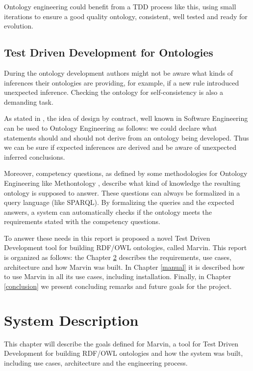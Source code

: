 \documentclass{report}
\begin{document}
Ontology engineering could benefit from a TDD process like this, using small iterations
to ensure a good quality ontology, consistent, well tested and ready for evolution.

\section{Test Driven Development for Ontologies}

During the ontology development authors might not be aware what kinds of inferences their ontologies are
providing, for example, if a new rule introduced unexpected inference. Checking the ontology for
self-consistency is also a demanding task.

As stated in \cite{vrandevcic06}, the idea of design by contract, well known in Software Engineering can
be used to Ontology Engineering as follows: we could declare what statements should and
should not derive from an ontology being developed. Thus we can be sure if expected inferences are
derived and be aware of unexpected inferred conclusions.

Moreover, competency questions, as defined by some methodologies for Ontology Engineering like Methontology \cite{lopez99},
describe what kind of knowledge the resulting ontology is supposed to answer. These questions can always be formalized in
a query language (like SPARQL). By formalizing the queries and the expected answers, a system can automatically checks if
the ontology meets the requirements stated with the competency questions.


To answer these needs in this report is proposed a novel Test Driven Development tool for building RDF/OWL ontologies, called
Marvin. This report is organized as follows: the Chapter \ref{system} describes the requirements, use cases, architecture and
how Marvin was built. In Chapter \ref{manual} it is described how to use Marvin in all its use cases, including installation.
Finally, in Chapter \ref{conclusion} we present concluding remarks and future goals for the project.

\chapter{System Description}
\label{system}

This chapter will describe the goals defined for Marvin, a tool for Test Driven Development for building RDF/OWL ontologies
and how the system was built, including use cases, architecture and the engineering process.
\end{document}
